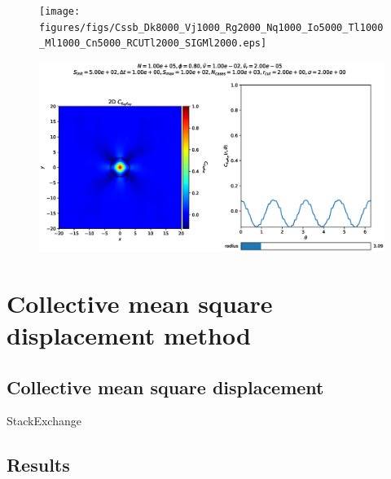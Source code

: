 \documentclass[class=report, float=false, crop=false]{standalone}
\begin{document}
\begin{figure}[h!]
\centering
\texttt{[image: figures/figs/Cssb\_Dk8000\_Vj1000\_Rg2000\_Nq1000\_Io5000\_Tl1000\_Ml1000\_Cn5000\_RCUTl2000\_SIGMl2000.eps]}
\caption{}
\label{css_map_real}
\end{figure}

\begin{figure}[h!]
\centering
\includegraphics[width=\textwidth]{figures/figs/Cssb_Dk8000_Vj1000_Rg2000_Nq1000_In5000_Tl1000_Ml1000_Co1000_Bn3000_XN1500_Yn1500_grid_circle.eps}
\caption{}
\label{css_map_real_quarter}
\end{figure}

\section{Collective mean square displacement method}

\subsection{Collective mean square displacement}

StackExchange \faStackExchange~ \cite{stackexchange}

\subsection{Results}
\end{document}
